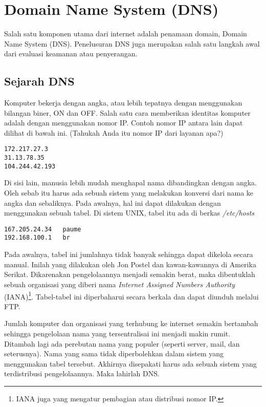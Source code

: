 \chapter{Domain Name System (DNS)}
Salah satu komponen utama dari internet adalah penamaan domain, Domain Name
System (DNS). Penelusuran DNS juga merupakan salah satu langkah awal dari
evaluasi keamanan atau penyerangan.

\section{Sejarah DNS}
Komputer bekerja dengan angka, atau lebih tepatnya dengan menggunakan bilangan
biner, ON dan OFF. Salah satu cara memberikan identitas komputer adalah dengan
menggunakan nomor IP. Contoh nomor IP antara lain dapat dilihat di bawah ini.
(Tahukah Anda itu nomor IP dari layanan apa?)

\begin{verbatim}
172.217.27.3
31.13.78.35
104.244.42.193
\end{verbatim}

Di sisi lain, manusia lebih mudah menghapal nama dibandingkan dengan angka.
Oleh sebab itu harus ada sebuah sistem yang melakukan konversi dari nama ke
angka dan sebaliknya. Pada awalnya, hal ini dapat dilakukan dengan menggunakan
sebuah tabel. Di sistem UNIX, tabel itu ada di berkas {\em /etc/hosts}

\begin{verbatim}
167.205.24.34   paume
192.168.100.1   br
\end{verbatim}

Pada awalnya, tabel ini jumlahnya tidak banyak sehingga dapat dikelola secara
manual. Inilah yang dilakukan oleh Jon Postel dan kawan-kawannya di Amerika
Serikat. Dikarenakan pengelolaannya menjadi semakin berat, maka dibentuklah
sebuah organisasi yang diberi nama {\em Internet Assigned Numbers Authority}
(IANA)\footnote{IANA juga yang mengatur pembagian atau distribusi nomor IP.}.
Tabel-tabel ini diperbaharui secara berkala dan dapat diunduh melalui FTP.

Jumlah komputer dan organisasi yang terhubung ke internet semakin bertambah
sehingga pengelolaan nama yang tersentralisai ini menjadi makin rumit. Ditambah
lagi ada perebutan nama yang populer (seperti server, mail, dan seterusnya).
Nama yang sama tidak diperbolehkan dalam sistem yang menggunakan tabel
tersebut. Akhirnya disepakati harus ada sebuah sistem yang terdistribusi
pengelolaannya. Maka lahirlah DNS.

